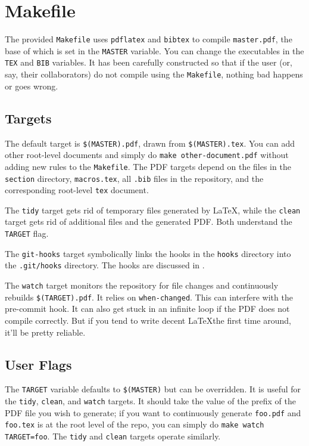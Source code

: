 \section{Makefile}\label{sec:make}

The provided \texttt{Makefile} uses \texttt{pdflatex} and \texttt{bibtex} to compile \texttt{master.pdf}, the base of which is set in the \texttt{MASTER} variable.
You can change the executables in the \texttt{TEX} and \texttt{BIB} variables.  It has been carefully constructed so that if the user (or, say, their collaborators) do not compile using the \texttt{Makefile}, nothing bad happens or goes wrong.

\subsection{Targets}

The default target is \texttt{\$(MASTER).pdf}, drawn from \texttt{\$(MASTER).tex}.
You can add other root-level documents and simply do \texttt{make other-document.pdf} without adding new rules to the \texttt{Makefile}.
The PDF targets depend on the files in the \texttt{section} directory, \texttt{macros.tex}, all \texttt{.bib} files in the repository, and the corresponding root-level \texttt{tex} document.

The \texttt{tidy} target gets rid of temporary files generated by \LaTeX, while the \texttt{clean} target gets rid of additional files and the generated PDF.  Both understand the \texttt{TARGET} flag.

The \texttt{git-hooks} target symbolically links the hooks in the \texttt{hooks} directory into the \texttt{.git/hooks} directory.  The hooks are discussed in .

The \texttt{watch} target monitors the repository for file changes and continuously rebuilds \texttt{\$(TARGET).pdf}.  It relies on \texttt{when-changed}\cite{when-changed}.
This can interfere with the pre-commit \git hook.
It can also get stuck in an infinite loop if the PDF does not compile correctly.
But if you tend to write decent \LaTeX the first time around, it'll be pretty reliable.


\subsection{User Flags}

The \texttt{TARGET} variable defaults to \texttt{\$(MASTER)} but can be overridden.  It is useful for the \texttt{tidy}, \texttt{clean}, and \texttt{watch} targets.
It should take the value of the prefix of the PDF file you wish to generate; if you want to continuously generate \texttt{foo.pdf} and \texttt{foo.tex} is at the root level of the repo, you can simply do \texttt{make watch TARGET=foo}.
The \texttt{tidy} and \texttt{clean} targets operate similarly.

